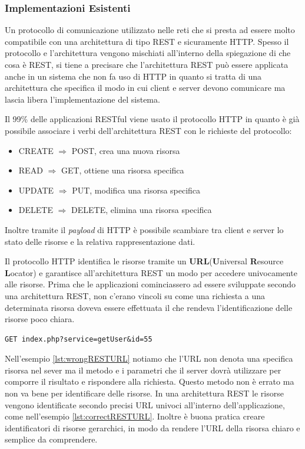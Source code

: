 \subsubsection{Implementazioni Esistenti}

Un protocollo di comunicazione utilizzato nelle reti che si presta ad essere molto compatibile con una architettura di tipo REST e sicuramente HTTP. Spesso il protocollo e l'architettura vengono mischiati all'interno della spiegazione di che cosa è REST, si tiene a precisare che l'architettura REST può essere applicata anche in un sistema che non fa uso di HTTP in quanto si tratta di una architettura che specifica il modo in cui client e server devono comunicare ma lascia libera l'implementazione del sistema.

Il 99\% delle applicazioni RESTful viene usato il protocollo HTTP in quanto è già possibile associare i verbi dell'architettura REST con le richieste del protocollo: 
\begin{itemize}
\item CREATE $\Rightarrow$ POST, crea una nuova risorsa

\item READ   $\Rightarrow$ GET, ottiene una risorsa specifica

\item UPDATE $\Rightarrow$ PUT, modifica una risorsa specifica

\item DELETE $\Rightarrow$ DELETE, elimina una risorsa specifica

\end{itemize}
Inoltre tramite il \emph{payload} di HTTP è possibile scambiare tra client e server lo stato delle risorse e la relativa rappresentazione dati.

Il protocollo HTTP identifica le risorse tramite un \textbf{URL}(\textbf{U}niversal \textbf{R}esource \textbf{L}ocator) e garantisce all'architettura REST un modo per accedere univocamente alle risorse.
Prima che le applicazioni cominciassero ad essere sviluppate secondo una architettura REST, non c'erano vincoli su come una richiesta a una determinata risorsa doveva essere effettuata il che rendeva l'identificazione delle risorse poco chiara.
\begin{lstlisting}[caption={Esempio di URL che non rispetta il vincolo di REST}, label={lst:wrongRESTURL}]
	GET index.php?service=getUser&id=55
\end{lstlisting}
Nell'esempio \ref{lst:wrongRESTURL} notiamo che l'URL non denota una specifica risorsa nel sever ma il metodo e i parametri che il server dovrà utilizzare per comporre il risultato e rispondere alla richiesta. Questo metodo non è errato ma non va bene per identificare delle risorse.
In una architettura REST le risorse vengono identificate secondo precisi URL univoci all'interno dell'applicazione, come nell'esempio \ref{lst:correctRESTURL}.
Inoltre è buona pratica creare identificatori di risorse gerarchici, in modo da rendere l'URL della risorsa chiaro e semplice da comprendere.

